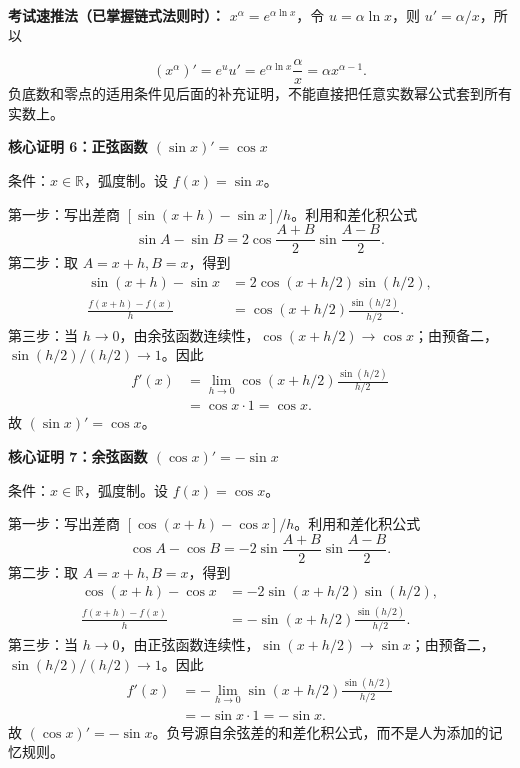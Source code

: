 \begin{proofbox}
\textbf{考试速推法（已掌握链式法则时）：} $x^\alpha=e^{\alpha\ln x}$，令 $u=\alpha\ln x$，则 $u'=\alpha/x$，所以


\[
(x^\alpha)'=e^u u'=e^{\alpha\ln x}\frac\alpha x=\alpha x^{\alpha-1}.
\]
负底数和零点的适用条件见后面的补充证明，不能直接把任意实数幂公式套到所有实数上。

\medskip
\begin{minipage}{\linewidth}
\textbf{\textcolor{CProof}{核心证明 6：正弦函数 $(\sin x)'=\cos x$}}


\end{minipage}

条件：$x\in\mathbb R$，弧度制。设 $f(x)=\sin x$。

第一步：写出差商 $[\sin(x+h)-\sin x]/h$。利用和差化积公式
\[
\sin A-\sin B=2\cos\frac{A+B}{2}\sin\frac{A-B}{2}.
\]
第二步：取 $A=x+h,B=x$，得到
\[
\begin{aligned}
\sin(x+h)-\sin x&=2\cos(x+h/2)\sin(h/2),\\
\frac{f(x+h)-f(x)}h&=\cos(x+h/2)\frac{\sin(h/2)}{h/2}.
\end{aligned}
\]
第三步：当 $h\to0$，由余弦函数连续性，$\cos(x+h/2)\to\cos x$；由预备二，$\sin(h/2)/(h/2)\to1$。因此
\[
\begin{aligned}
f'(x)&=\lim_{h\to0}\cos(x+h/2)\frac{\sin(h/2)}{h/2}\\
&=\cos x\cdot1=\cos x.
\end{aligned}
\]
故 $\boxed{(\sin x)'=\cos x}$。

\medskip
\begin{minipage}{\linewidth}
\textbf{\textcolor{CProof}{核心证明 7：余弦函数 $(\cos x)'=-\sin x$}}


\end{minipage}

条件：$x\in\mathbb R$，弧度制。设 $f(x)=\cos x$。

第一步：写出差商 $[\cos(x+h)-\cos x]/h$。利用和差化积公式
\[
\cos A-\cos B=-2\sin\frac{A+B}{2}\sin\frac{A-B}{2}.
\]
第二步：取 $A=x+h,B=x$，得到
\[
\begin{aligned}
\cos(x+h)-\cos x&=-2\sin(x+h/2)\sin(h/2),\\
\frac{f(x+h)-f(x)}h&=-\sin(x+h/2)\frac{\sin(h/2)}{h/2}.
\end{aligned}
\]
第三步：当 $h\to0$，由正弦函数连续性，$\sin(x+h/2)\to\sin x$；由预备二，$\sin(h/2)/(h/2)\to1$。因此
\[
\begin{aligned}
f'(x)&=-\lim_{h\to0}\sin(x+h/2)\frac{\sin(h/2)}{h/2}\\
&=-\sin x\cdot1=-\sin x.
\end{aligned}
\]
故 $\boxed{(\cos x)'=-\sin x}$。负号源自余弦差的和差化积公式，而不是人为添加的记忆规则。


\end{proofbox}
